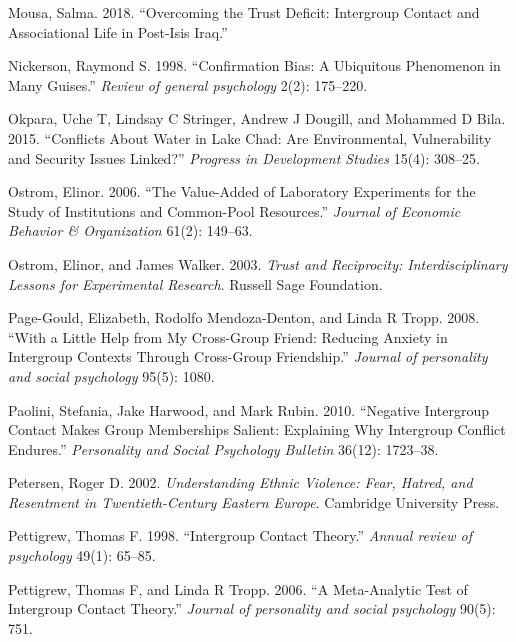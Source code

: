 \documentclass[11pt]{article}
\begin{document}
\leavevmode\hypertarget{ref-mousa2018overcome}{}%
Mousa, Salma. 2018. ``Overcoming the Trust Deficit: Intergroup Contact
and Associational Life in Post-Isis Iraq.''

\leavevmode\hypertarget{ref-nickerson1998confirmation}{}%
Nickerson, Raymond S. 1998. ``Confirmation Bias: A Ubiquitous Phenomenon
in Many Guises.'' \emph{Review of general psychology} 2(2): 175--220.

\leavevmode\hypertarget{ref-okpara2015conflicts}{}%
Okpara, Uche T, Lindsay C Stringer, Andrew J Dougill, and Mohammed D
Bila. 2015. ``Conflicts About Water in Lake Chad: Are Environmental,
Vulnerability and Security Issues Linked?'' \emph{Progress in
Development Studies} 15(4): 308--25.

\leavevmode\hypertarget{ref-ostrom2006value}{}%
Ostrom, Elinor. 2006. ``The Value-Added of Laboratory Experiments for
the Study of Institutions and Common-Pool Resources.'' \emph{Journal of
Economic Behavior \& Organization} 61(2): 149--63.

\leavevmode\hypertarget{ref-ostrom2003trust}{}%
Ostrom, Elinor, and James Walker. 2003. \emph{Trust and Reciprocity:
Interdisciplinary Lessons for Experimental Research}. Russell Sage
Foundation.

\leavevmode\hypertarget{ref-page2008little}{}%
Page-Gould, Elizabeth, Rodolfo Mendoza-Denton, and Linda R Tropp. 2008.
``With a Little Help from My Cross-Group Friend: Reducing Anxiety in
Intergroup Contexts Through Cross-Group Friendship.'' \emph{Journal of
personality and social psychology} 95(5): 1080.

\leavevmode\hypertarget{ref-paolini2010negative}{}%
Paolini, Stefania, Jake Harwood, and Mark Rubin. 2010. ``Negative
Intergroup Contact Makes Group Memberships Salient: Explaining Why
Intergroup Conflict Endures.'' \emph{Personality and Social Psychology
Bulletin} 36(12): 1723--38.

\leavevmode\hypertarget{ref-petersen2002understanding}{}%
Petersen, Roger D. 2002. \emph{Understanding Ethnic Violence: Fear,
Hatred, and Resentment in Twentieth-Century Eastern Europe}. Cambridge
University Press.

\leavevmode\hypertarget{ref-pettigrew1998intergroup}{}%
Pettigrew, Thomas F. 1998. ``Intergroup Contact Theory.'' \emph{Annual
review of psychology} 49(1): 65--85.

\leavevmode\hypertarget{ref-pettigrew2006meta}{}%
Pettigrew, Thomas F, and Linda R Tropp. 2006. ``A Meta-Analytic Test of
Intergroup Contact Theory.'' \emph{Journal of personality and social
psychology} 90(5): 751.
\end{document}
